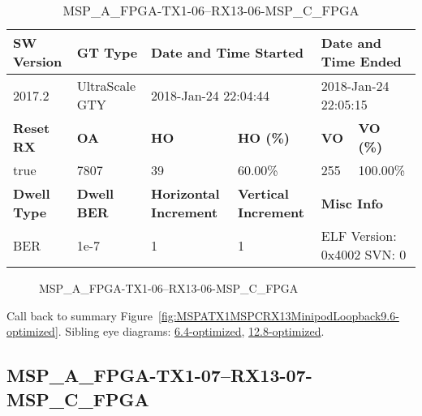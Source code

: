 \begin{table}[h]
\centering
\caption{MSP\_A\_FPGA-TX1-06--RX13-06-MSP\_C\_FPGA}
\label{tab:MSPAFPGATX106RX1306MSPCFPGA9.6-optimized}
\begin{tabular}{@{}|l|l|l|l|l|l|@{}}
\toprule
\textbf{SW Version}                & \textbf{GT Type}   & \multicolumn{2}{l|}{\textbf{Date and Time Started}}            & \multicolumn{2}{l|}{\textbf{Date and Time Ended}}        \\ \midrule
2017.2                       & UltraScale GTY          & \multicolumn{2}{l|}{2018-Jan-24 22:04:44}                   & \multicolumn{2}{l|}{2018-Jan-24 22:05:15}               \\ \midrule
\textbf{Reset RX}                  & \textbf{OA} & \textbf{HO}   & \textbf{HO (\%)} & \textbf{VO} & \textbf{VO (\%)} \\ \midrule
true & 7807        & 39          & 60.00\%        & 255        & 100.00\%       \\ \midrule
\textbf{Dwell Type}                & \textbf{Dwell BER} & \textbf{Horizontal Increment} & \textbf{Vertical Increment}    & \multicolumn{2}{l|}{\textbf{Misc Info}}                  \\ \midrule
BER                            & 1e-7        & 1        & 1           & \multicolumn{2}{l|}{ELF Version: 0x4002 SVN: 0}                         \\ \bottomrule
\end{tabular}
\end{table}

\begin{figure}[h]
\caption{MSP\_A\_FPGA-TX1-06--RX13-06-MSP\_C\_FPGA} \label{fig:MSPAFPGATX106RX1306MSPCFPGA9.6-optimized}
\end{figure}

Call back to summary Figure~\ref{fig:MSPATX1MSPCRX13MinipodLoopback9.6-optimized}.
Sibling eye diagrams: \hyperref[sec:MSPAFPGATX106RX1306MSPCFPGA6.4-optimized]{6.4-optimized}, \hyperref[sec:MSPAFPGATX106RX1306MSPCFPGA12.8-optimized]{12.8-optimized}.

\clearpage
\newpage


\subsection{MSP\_A\_FPGA-TX1-07--RX13-07-MSP\_C\_FPGA}\label{sec:MSPAFPGATX107RX1307MSPCFPGA9.6-optimized}

